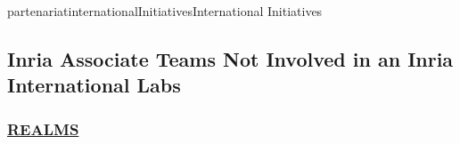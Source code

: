 \documentclass{ra2016}
\begin{document}
\begin{module}{partenariat}{internationalInitiatives}{International Initiatives}

\subsection{Inria Associate Teams Not Involved in an Inria International Labs}

%

\subsubsection{\href{http://glaser.berkeley.edu et http://www-personal.umich.edu/~bkerkez/}{REALMS }}


\end{module}
\end{document}
